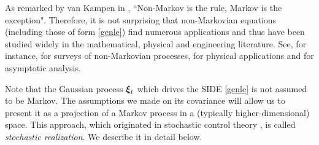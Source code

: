 
As remarked by van Kampen in \cite{van1998remarks}, ``Non-Markov is the rule, Markov is the exception". Therefore, it is not surprising that non-Markovian equations (including those of form \eqref{genle}) find numerous applications and thus have been studied widely in the mathematical, physical and engineering literature.  See, for instance,  \cite{luczka2005non, samorodnitsky1994stable} for surveys of non-Markovian processes, \cite{PhysRevB.89.134303,mckinley2009transient,adelman1976generalized} for physical applications and \cite{Ottobre} for asymptotic analysis.





Note that the Gaussian process $\boldsymbol{\xi}_t$ which drives the SIDE \eqref{genle} is not assumed to be Markov.  The assumptions we made on its covariance will allow us to present it as a projection of a Markov process in a (typically higher-dimensional) space.  This approach, which originated in stochastic control theory \cite{kalman1960new}, is called {\it stochastic realization}. We describe it in detail below. 


